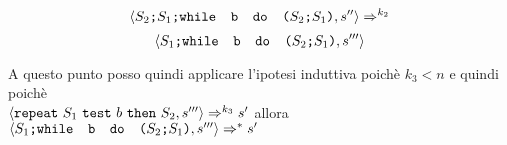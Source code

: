 {\begin{itemize}
		\[ \confSs{\concat{\concat{$S_2$}{$S_1$}}
		{\wbS{b}{(\concat{$S_2$}{$S_1$})}}}{s''}\Rar{k_2} \]
	\[ 	\confSs{\concat{$S_1$}{\wbS{b}{(\concat{$S_2$}{$S_1$})}}}{s'''} \]

		A questo punto posso quindi applicare l'ipotesi induttiva poichè $k_3<n$
		e quindi poichè \\$\confSs{\repeatSbS{S_1}{b}{S_2}}{s'''}\Rar{k_3}s'$
		allora 
		$\confSs{\concat{$S_1$}{\wbS{b}{(\concat{$S_2$}{$S_1$})}}}{s'''}
		\Rar{*}s'$

	\end{itemize}
}
\newpage